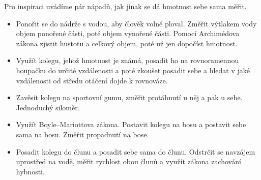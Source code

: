 \documentclass{../../../../style/mkimain}
\begin{document}
\noindent{}
\klein
Pro inspiraci uvádíme pár nápadů, jak jinak se dá hmotnost sebe sama měřit.
\begin{itemize}
    \item Ponořit se do nádrže s vodou, aby člověk volně ploval. Změřit výtlakem vody objem ponořené části,
    poté objem vynořené části. Pomocí Archimédova zákona zjistit hustotu a celkový objem, poté už jen dopočíst hmotnost.
    \item Využít kolegu, jehož hmotnost je známá, posadit ho na rovnoramennou houpačku do určité vzdálenosti a
    poté zkoušet posadit sebe a hledat v jaké vzdálenosti od středu otáčení dojde k rovnováze.
    \item Zavěsit kolegu na sportovní gumu, změřit protáhnutí u něj a pak u sebe. Jednoduchý siloměr.
    \item Využít Boyle–Mariottova zákona. Postavit kolegu na bosu a postavit sebe sama na bosu. Změřit propadnutí na bose.
    \item Posadit kolegu do člunu a posadit sebe sama do člunu. Odstrčit se navzájem uprostřed na vodě, měřit rychlost obou člunů a využít zákona zachování hybnosti. 
\end{itemize}
\end{document}
